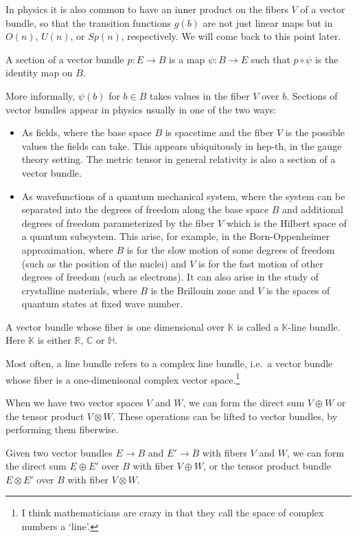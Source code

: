 \documentclass[12pt]{article}
\numberwithin{equation}{section}
\numberwithin{figure}{section}
\theoremstyle{remark}
\def\bC{\mathbb{C}}
\def\bH{\mathbb{H}}
\def\bK{\mathbb{K}}
\def\bR{\mathbb{R}}
\begin{document}
In physics it is also common to have an inner product on the fibers $V$ of a vector bundle,
so that the transition functions $g (b)$ are not just linear maps
but in $O(n)$, $U(n)$, or $Sp(n)$, respectively.
We will come back to this point later.


\begin{definition}
  A section of a vector bundle $p:E\to B$ is a map $\psi: B\to E$ such that $p\circ \psi $ is the identity map on $B$.
\end{definition}
More informally, $\psi(b)$ for $b\in B$ takes values in the fiber $V$ over $b$.
Sections of vector bundles appear in physics usually in one of the two ways:
\begin{itemize}
  \item As fields, where the base space $B$ is spacetime and 
  the fiber $V$ is the possible values the fields can take.
  This appears ubiquitously in hep-th, in the gauge theory setting.
  The metric tensor in general relativity is also a section of a vector bundle.
  \item As wavefunctions of a quantum mechanical system, 
  where the system can be separated 
  into the degrees of freedom along the base space $B$
  and additional degrees of freedom parameterized by the fiber $V$ 
  which is the Hilbert space of a quantum subsystem.
  This arise, for example, in the Born-Oppenheimer approximation,
  where $B$ is for the slow motion of some degrees of freedom (such as the position of the nuclei) and 
  $V$ is for the fast motion of other degrees of freedom (such as electrons).
  It can also arise in the study of crystalline materials,
  where $B$ is the Brillouin zone and $V$ is the spaces of quantum states at fixed wave number.
\end{itemize}

\begin{definition}
A vector bundle whose fiber is one dimensional over $\bK$ is called a 
$\bK$-line bundle.
Here $\bK$ is either $\bR$, $\bC$ or $\bH$.
\end{definition}
Most often, a line bundle refers to a complex line bundle, i.e.~a vector bundle
whose fiber is a one-dimenisonal complex vector space.\footnote{%
I think mathematicians are crazy in that they call the space of complex numbers a `line'.
}

When we have two vector spaces $V$ and $W$,
we can form the direct sum $V\oplus W$ or the tensor product $V\otimes W$.
These operations can be lifted to vector bundles,
by performing them fiberwise.
\begin{definition}
  Given two vector bundles $E\to B$ and $E'\to B$ with fibers $V$ and $W$,
  we can form the direct sum $E\oplus E'$ over $B$ with fiber $V\oplus W$,
  or the tensor product bundle $E\otimes E'$ over $B$ with fiber $V\otimes W$.  
\end{definition}
\end{document}
